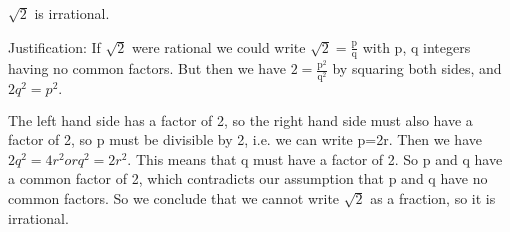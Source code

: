 
$ \sqrt{2} $ is irrational.
\par
Justification: If $ \sqrt{2} $ were rational we could write
$ \sqrt{2} = \frac{\mathrm{p}}{\mathrm{q}} $ with p, q integers having
no common factors. But then we have $ 2 = \frac{\mathrm{p}^2}{\mathrm{q}^2} $ 
by squaring both sides, and $2q^{2}=p^{2}.$ 
\par
The left hand side has a factor of 2, so the right hand side must also 
have a factor of 2, so p must be divisible by 2, i.e. we can write
p=2r. Then we have $2q^{2}=4r^{2} or q^{2}=2r^{2}.$  This means that
q must have a factor of 2. So p and q have a common factor of 2, which contradicts our
assumption that p and q have no common factors. So we conclude that we
cannot write $ \sqrt{2} $ as a fraction, so it is irrational.